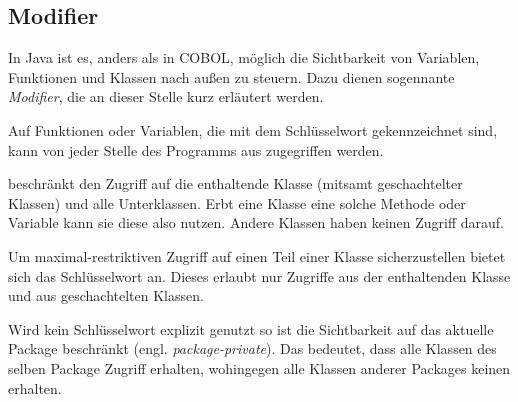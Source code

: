 \subsection{Modifier}
In Java ist es, anders als in COBOL, möglich die Sichtbarkeit von Variablen, Funktionen und Klassen nach außen zu steuern. Dazu dienen sogennante \textit{Modifier}, die an dieser Stelle kurz erläutert werden.

Auf Funktionen oder Variablen, die mit dem Schlüsselwort  gekennzeichnet sind, kann von jeder Stelle des Programms aus zugegriffen werden.

 beschränkt den Zugriff auf die enthaltende Klasse (mitsamt geschachtelter Klassen) und alle Unterklassen. Erbt eine Klasse eine solche Methode oder Variable kann sie diese also nutzen. Andere Klassen haben keinen Zugriff darauf.

Um maximal-restriktiven Zugriff auf einen Teil einer Klasse sicherzustellen bietet sich das Schlüsselwort  an. Dieses erlaubt nur Zugriffe aus der enthaltenden Klasse und aus geschachtelten Klassen.

Wird kein Schlüsselwort explizit genutzt so ist die Sichtbarkeit auf das aktuelle Package beschränkt (engl. \textit{package-private}). Das bedeutet, dass alle Klassen des selben Package Zugriff erhalten, wohingegen alle Klassen anderer Packages keinen erhalten.